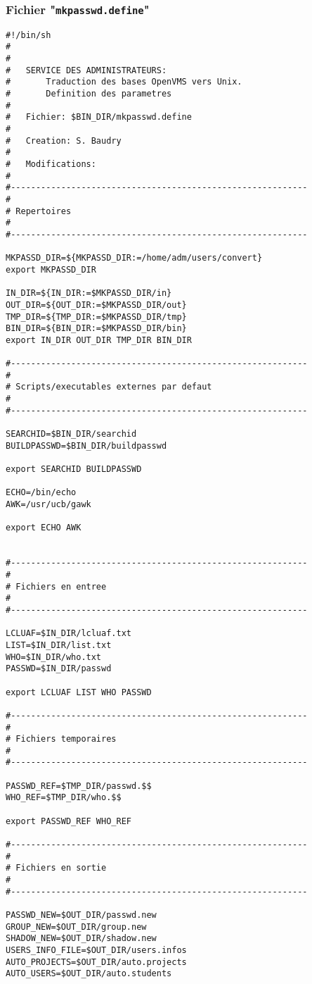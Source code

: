 \subsubsection{\label{adv-programming-ex3-pgmdef}Fichier "{\tt mkpasswd.define}"}

\begin{verbatim}
#!/bin/sh
#
#
#   SERVICE DES ADMINISTRATEURS:
#       Traduction des bases OpenVMS vers Unix.
#       Definition des parametres
#
#   Fichier: $BIN_DIR/mkpasswd.define
#
#   Creation: S. Baudry
#
#   Modifications:
#
#-----------------------------------------------------------
#
# Repertoires
#
#-----------------------------------------------------------

MKPASSD_DIR=${MKPASSD_DIR:=/home/adm/users/convert}
export MKPASSD_DIR

IN_DIR=${IN_DIR:=$MKPASSD_DIR/in}
OUT_DIR=${OUT_DIR:=$MKPASSD_DIR/out}
TMP_DIR=${TMP_DIR:=$MKPASSD_DIR/tmp}
BIN_DIR=${BIN_DIR:=$MKPASSD_DIR/bin}
export IN_DIR OUT_DIR TMP_DIR BIN_DIR

#-----------------------------------------------------------
#
# Scripts/executables externes par defaut
#
#-----------------------------------------------------------

SEARCHID=$BIN_DIR/searchid
BUILDPASSWD=$BIN_DIR/buildpasswd

export SEARCHID BUILDPASSWD

ECHO=/bin/echo
AWK=/usr/ucb/gawk

export ECHO AWK


#-----------------------------------------------------------
#
# Fichiers en entree
#
#-----------------------------------------------------------

LCLUAF=$IN_DIR/lcluaf.txt
LIST=$IN_DIR/list.txt
WHO=$IN_DIR/who.txt
PASSWD=$IN_DIR/passwd

export LCLUAF LIST WHO PASSWD

#-----------------------------------------------------------
#
# Fichiers temporaires
#
#-----------------------------------------------------------

PASSWD_REF=$TMP_DIR/passwd.$$
WHO_REF=$TMP_DIR/who.$$

export PASSWD_REF WHO_REF

#-----------------------------------------------------------
#
# Fichiers en sortie
#
#-----------------------------------------------------------

PASSWD_NEW=$OUT_DIR/passwd.new
GROUP_NEW=$OUT_DIR/group.new
SHADOW_NEW=$OUT_DIR/shadow.new
USERS_INFO_FILE=$OUT_DIR/users.infos
AUTO_PROJECTS=$OUT_DIR/auto.projects
AUTO_USERS=$OUT_DIR/auto.students


\end{verbatim}
